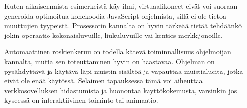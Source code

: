 Kuten aikaisemmista esimerkeistä käy ilmi, virtuaalikoneet eivät voi suoraan generoida optimoitua konekoodia JavaScript-ohjelmista, sillä ei ole tietoa muuttujien tyypeistä. Prosessorin kannalta on hyvin tärkeää tietää tehdäänkö jokin operaatio kokonaisluvuille, liukuluvuille vai kenties merkkijonoille.

Automaattinen roskienkeruu on todella kätevä toiminnallisuus ohjelmoijan kannalta, mutta sen toteuttaminen hyvin on haastavaa. Ohjelman on pysähdyttävä ja käytävä läpi muistin sisältöä ja vapauttaa muistialueita, jotka eivät ole enää käytössä. Selaimen tapauksessa tämä voi aiheuttaa verkkosovelluksen hidastumista ja huonontaa käyttökokemusta, varsinkin jos kyseessä on interaktiivinen toiminto tai animaatio.